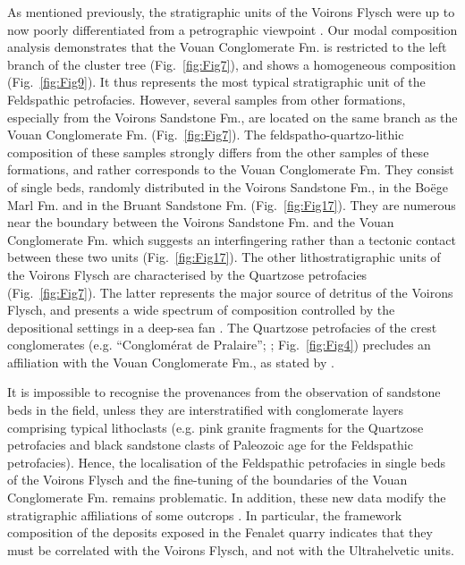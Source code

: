 \documentclass[twoside]{article}
\begin{document}
As mentioned previously, the stratigraphic units of the Voirons Flysch were up to now poorly differentiated from a petrographic viewpoint \citep{Lombard1940a,Stuijvenberg1980a,Charollais1998}. Our modal composition analysis demonstrates that the Vouan Conglomerate Fm. is restricted to the left branch of the cluster tree (Fig.~\ref{fig:Fig7}), and shows a homogeneous composition (Fig.~\ref{fig:Fig9}). It thus represents the most typical stratigraphic unit of the Feldspathic petrofacies. However, several samples from other formations, especially from the Voirons Sandstone Fm., are located on the same branch as the Vouan Conglomerate Fm. (Fig.~\ref{fig:Fig7}). The feldspatho-quartzo-lithic composition of these samples strongly differs from the other samples of these formations, and rather corresponds to the Vouan Conglomerate Fm. They consist of single beds, randomly distributed in the Voirons Sandstone Fm., in the Boëge Marl Fm. and in the Bruant Sandstone Fm. (Fig.~\ref{fig:Fig17}). They are numerous near the boundary between the Voirons Sandstone Fm. and the Vouan Conglomerate Fm. which suggests an interfingering rather than a tectonic contact between these two units (Fig.~\ref{fig:Fig17}).
The other lithostratigraphic units of the Voirons Flysch are characterised by the Quartzose petrofacies (Fig.~\ref{fig:Fig7}). The latter represents the major source of detritus of the Voirons Flysch, and presents a wide spectrum of composition controlled by the depositional settings in a deep-sea fan \citep{Ragusa2015}. The Quartzose petrofacies of the crest conglomerates (e.g. “Conglomérat de Pralaire”; \citealp{Lombard1940a}; Fig.~\ref{fig:Fig4}) precludes an affiliation with the Vouan Conglomerate Fm., as stated by \citep{Stuijvenberg1980a}.\par
It is impossible to recognise the provenances from the observation of sandstone beds in the field, unless they are interstratified with conglomerate layers comprising typical lithoclasts (e.g. pink granite fragments for the Quartzose petrofacies and black sandstone clasts of Paleozoic age for the Feldspathic petrofacies). Hence, the localisation of the Feldspathic petrofacies in single beds of the Voirons Flysch and the fine-tuning of the boundaries of the Vouan Conglomerate Fm. remains problematic. In addition, these new data modify the stratigraphic affiliations of some outcrops \citep{Ragusa2015}. In particular, the framework composition of the deposits exposed in the Fenalet quarry indicates that they must be correlated with the Voirons Flysch, and not with the Ultrahelvetic units.
\end{document}
